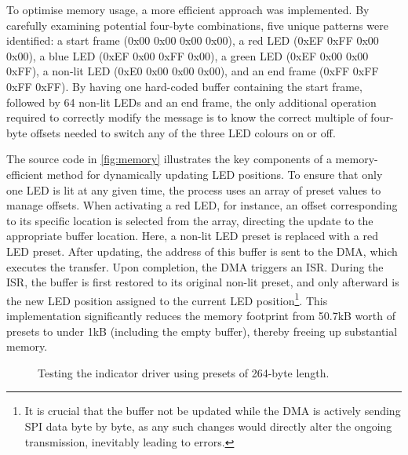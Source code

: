 \documentclass[12pt]{article}
\numberwithin{subsubsubsection}{subsubsection}
\begin{document}
To optimise memory usage, a more efficient approach was implemented. By carefully examining potential four-byte combinations, five unique patterns were identified: a start frame (0x00 0x00 0x00 0x00), a red LED (0xEF 0xFF 0x00 0x00), a blue LED (0xEF 0x00 0xFF 0x00), a green LED (0xEF 0x00 0x00 0xFF), a non-lit LED (0xE0 0x00 0x00 0x00), and an end frame (0xFF 0xFF 0xFF 0xFF). By having one hard-coded buffer containing the start frame, followed by 64 non-lit LEDs and an end frame, the only additional operation required to correctly modify the message is to know the correct multiple of four-byte offsets needed to switch any of the three LED colours on or off. 

The source code in \autoref{fig:memory} illustrates the key components of a memory-efficient method for dynamically updating LED positions. To ensure that only one LED is lit at any given time, the process uses an array of preset values to manage offsets. When activating a red LED, for instance, an offset corresponding to its specific location is selected from the array, directing the update to the appropriate buffer location. Here, a non-lit LED preset is replaced with a red LED preset. After updating, the address of this buffer is sent to the DMA, which executes the transfer. Upon completion, the DMA triggers an ISR. During the ISR, the buffer is first restored to its original non-lit preset, and only afterward is the new LED position assigned to the current LED position\footnote{It is crucial that the buffer not be updated while the DMA is actively sending SPI data byte by byte, as any such changes would directly alter the ongoing transmission, inevitably leading to errors.}. This implementation significantly reduces the memory footprint from 50.7kB worth of presets to under 1kB (including the empty buffer), thereby freeing up substantial memory.

\begin{figure}[H]
    \centering
    \caption{Testing the indicator driver using presets of 264-byte length.}
    \label{fig:led_test_1}
\end{figure}
\end{document}
